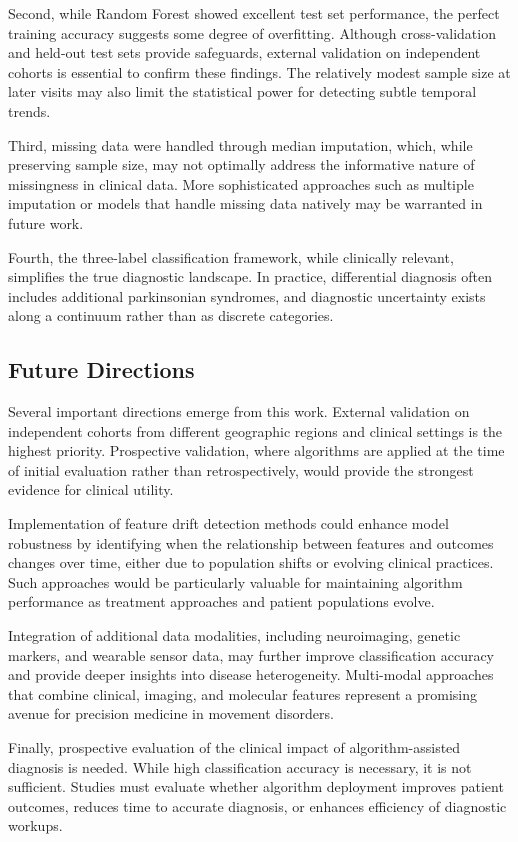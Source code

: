 \documentclass[12pt,a4paper]{article}
\begin{document}
Second, while Random Forest showed excellent test set performance, the perfect training accuracy suggests some degree of overfitting. Although cross-validation and held-out test sets provide safeguards, external validation on independent cohorts is essential to confirm these findings. The relatively modest sample size at later visits may also limit the statistical power for detecting subtle temporal trends.

Third, missing data were handled through median imputation, which, while preserving sample size, may not optimally address the informative nature of missingness in clinical data. More sophisticated approaches such as multiple imputation or models that handle missing data natively may be warranted in future work.

Fourth, the three-label classification framework, while clinically relevant, simplifies the true diagnostic landscape. In practice, differential diagnosis often includes additional parkinsonian syndromes, and diagnostic uncertainty exists along a continuum rather than as discrete categories.

\subsection*{Future Directions}

Several important directions emerge from this work. External validation on independent cohorts from different geographic regions and clinical settings is the highest priority. Prospective validation, where algorithms are applied at the time of initial evaluation rather than retrospectively, would provide the strongest evidence for clinical utility.

Implementation of feature drift detection methods could enhance model robustness by identifying when the relationship between features and outcomes changes over time, either due to population shifts or evolving clinical practices. Such approaches would be particularly valuable for maintaining algorithm performance as treatment approaches and patient populations evolve.

Integration of additional data modalities, including neuroimaging, genetic markers, and wearable sensor data, may further improve classification accuracy and provide deeper insights into disease heterogeneity. Multi-modal approaches that combine clinical, imaging, and molecular features represent a promising avenue for precision medicine in movement disorders.

Finally, prospective evaluation of the clinical impact of algorithm-assisted diagnosis is needed. While high classification accuracy is necessary, it is not sufficient. Studies must evaluate whether algorithm deployment improves patient outcomes, reduces time to accurate diagnosis, or enhances efficiency of diagnostic workups.
\end{document}
